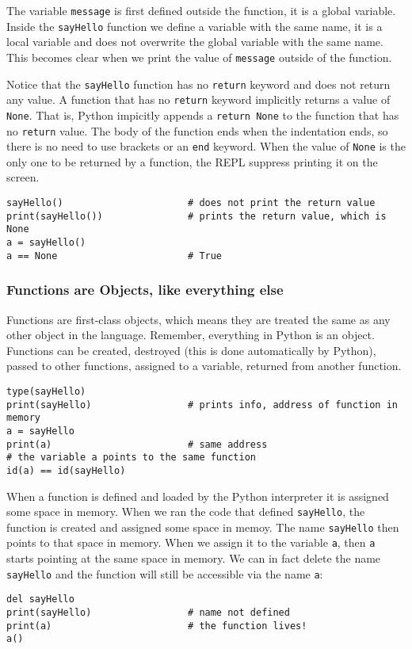 \documentclass[12pt, a4paper]{article}
\begin{document}
The variable \texttt{message} is first defined outside the function, it is a global variable.
Inside the \texttt{sayHello} function we define a variable with the same name, it is a local variable and does not overwrite the global variable with the same name.
This becomes clear when we print the value of \texttt{message} outside of the function.

Notice that the \texttt{sayHello} function has no \texttt{return} keyword and does not return any value.
A function that has no \texttt{return} keyword implicitly returns a value of \texttt{None}.
That is, Python impicitly appends a \texttt{return None} to the function that has no \texttt{return} value.
The body of the function ends when the indentation ends, so there is no need to use brackets or an \texttt{end} keyword.
When the value of \texttt{None} is the only one to be returned by a function, the REPL suppress printing it on the screen.
\lstset{language=jupyter-python,label= ,caption= ,captionpos=b,numbers=none}
\begin{lstlisting}
sayHello()                      # does not print the return value
print(sayHello())               # prints the return value, which is None
a = sayHello()
a == None                       # True
\end{lstlisting}
\subsubsection{Functions are Objects, like everything else}
\label{sec:orgdf134e4}
Functions are first-class objects, which means they are treated the same as any other object in the language.
Remember, everything in Python is an object.
Functions can be created, destroyed (this is done automatically by Python), passed to other functions, assigned to a variable, returned from another function.
\lstset{language=jupyter-python,label= ,caption= ,captionpos=b,numbers=none}
\begin{lstlisting}
type(sayHello)
print(sayHello)                 # prints info, address of function in memory
a = sayHello
print(a)                        # same address
# the variable a points to the same function
id(a) == id(sayHello)
\end{lstlisting}
When a function is defined and loaded by the Python interpreter it is assigned some space in memory.
When we ran the code that defined \texttt{sayHello}, the function is created and assigned some space in memoy.
The name \texttt{sayHello} then points to that space in memory.
When we assign it to the variable \texttt{a}, then \texttt{a} starts pointing at the same space in memory.
We can in fact delete the name \texttt{sayHello} and the function will still be accessible via the name \texttt{a}:
\lstset{language=jupyter-python,label= ,caption= ,captionpos=b,numbers=none}
\begin{lstlisting}
del sayHello
print(sayHello)                 # name not defined
print(a)                        # the function lives!
a()
\end{lstlisting}
\end{document}
